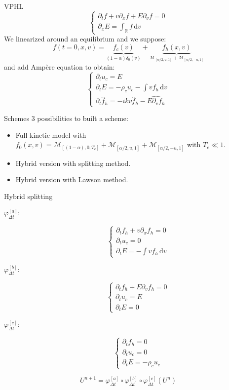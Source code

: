 \documentclass{beamer}
\begin{document}
\begin{frame}{VPHL}
  $$
    \begin{cases}
      \partial_tf + v\partial_xf + E\partial_vf = 0 \\
      \partial_xE = \int_\mathbb{R} f\,\mathrm{d}v
    \end{cases}
  $$
  We linearized around an equilibrium and we suppose:
  $$
    f(t=0,x,v) = \underbrace{f_c(v)}_{(1-\alpha)\delta_0(v)} + \underbrace{f_h(x,v)}_{\mathcal{M}_{[\alpha/2,u,1]}+\mathcal{M}_{[\alpha/2,-u,1]}}
  $$
  and add Ampère equation to obtain:
  $$
    \begin{cases}
      \partial_t u_c = E \\
      \partial_t E = -\rho_cu_c - \int vf_h\,\mathrm{d}v \\
      \partial_t \hat{f}_h = -ikv\hat{f}_h - \widehat{E\partial_v f_h}
    \end{cases}
  $$
\end{frame}
\begin{frame}{Schemes}
  3 possibilities to built a scheme:
  \begin{itemize}
    \item Full-kinetic model with $f_0(x,v) = \mathcal{M}_{[(1-\alpha),0,T_c]}+\mathcal{M}_{[\alpha/2,u,1]}+\mathcal{M}_{[\alpha/2,-u,1]}$ with $T_c \ll 1$.
    \item Hybrid version with splitting method.
    \item Hybrid version with Lawson method.
  \end{itemize}
\end{frame}
\begin{frame}{Hybrid splitting}
  \begin{description}
    \item[$\varphi_{\Delta t}^{[a]}$:] $$
      \begin{cases}
        \partial_t f_h + v\partial_x f_h = 0 \\
        \partial_t u_c = 0 \\
        \partial_t E = -\int vf_h\,\mathrm{d}v
      \end{cases}
    $$
    \item[$\varphi_{\Delta t}^{[b]}$:] $$
      \begin{cases}
        \partial_t f_h + E\partial_v f_h = 0 \\
        \partial_t u_c = E \\
        \partial_t E = 0
      \end{cases}
    $$
    \item[$\varphi_{\Delta t}^{[c]}$:] $$
      \begin{cases}
        \partial_t f_h = 0 \\
        \partial_t u_c = 0 \\
        \partial_t E = -\rho_cu_c
      \end{cases}
    $$
  \end{description}
  $$
    U^{n+1} = \varphi^{[a]}_{\Delta t} \circ \varphi^{[b]}_{\Delta t} \circ \varphi^{[c]}_{\Delta t} (U^n)
  $$
\end{frame}
\end{document}
